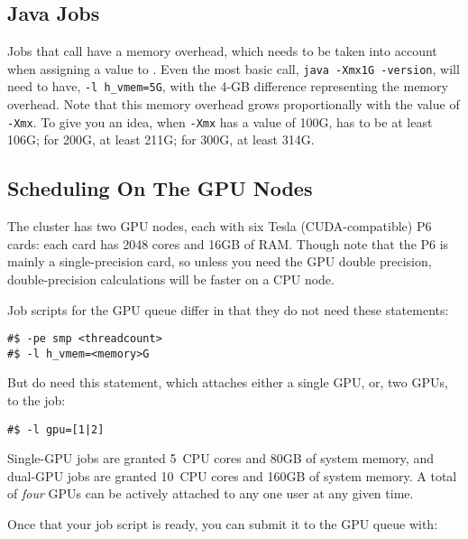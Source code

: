 \documentclass{easychair}
\begin{document}
\subsection{Java Jobs}

Jobs that call  have a memory overhead, which needs to be taken 
into account when assigning a value to . Even the most basic 
 call, \texttt{java -Xmx1G -version}, will need to have,
\texttt{-l h\_vmem=5G}, with the 4-GB difference representing the memory overhead. 
Note that this memory overhead grows proportionally with the value of
\texttt{-Xmx}. To give you an idea, when \texttt{-Xmx} has a value of 100G,
 has to be at least 106G; for 200G, at least 211G; for 300G, at least 314G.


\subsection{Scheduling On The GPU Nodes}

The cluster has two GPU nodes, each with six Tesla (CUDA-compatible) P6
cards: each card has 2048 cores and 16GB of RAM. Though note that the P6
is mainly a single-precision card, so unless you need the GPU double
precision, double-precision calculations will be faster on a CPU node.

Job scripts for the GPU queue differ in that they do not need these
statements:

\begin{verbatim}
#$ -pe smp <threadcount>
#$ -l h_vmem=<memory>G
\end{verbatim}

But do need this statement, which attaches either a single GPU, or, two
GPUs, to the job:

\begin{verbatim}
#$ -l gpu=[1|2]
\end{verbatim}

Single-GPU jobs are granted 5~CPU cores and 80GB of system memory, and
dual-GPU jobs are granted 10~CPU cores and 160GB of system memory. A
total of \emph{four} GPUs can be actively attached to any one user at any given
time.

Once that your job script is ready, you can submit it to the GPU queue
with:
\end{document}
